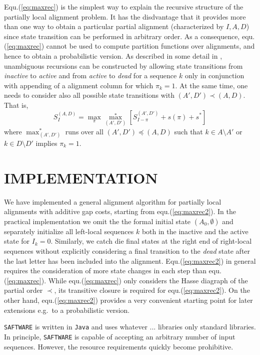 \documentclass[a4paper,10pt]{article}
\newcommand{\TODO}[1]{\begingroup\color{red}#1\endgroup}
\newcommand{\NR}[1]{\begingroup\color{orange}#1\endgroup}
\newcommand{\SAFTWARE}{\TODO{\texttt{SAFTWARE}}}
\begin{document}
Equ.(\ref{eq:maxrec}) is the simplest way to explain the recursive
structure of the partially local alignment problem. It has the disdvantage
that it provides more than one way to obtain a particular partial alignment
(characterized by $I,A,D$) since state transition can be performed in
arbitrary order. As a consequence, equ.(\ref{eq:maxrec}) cannot be used to
compute partition functions over alignments, and hence to obtain a
probabilistic version. As described in some detail in \citet{Retzlaff:18a},
unambiguous recursions can be constructed by allowing state transitions
from \textit{inactive} to \textit{active} and from \textit{active} to
\textit{dead} for a sequence $k$ only in conjunction with appending of a
alignment column for which $\pi_k=1$.  At the same time, one needs to
consider also all possible state transitions with $(A',D')\prec(A,D)$. That
is,
\begin{equation}
  S^{(A,D)}_I = 
  \displaystyle\max_{\pi} \displaystyle\max_{(A',D')}^*
  \left[ S^{(A',D')}_{I-\pi} + s(\pi) + s^* \right]
  \label{eq:maxrec2}
\end{equation}
where $\max_{(A',D')}^*$ runs over all $(A',D')\preceq(A,D)$ such that
$k\in A\setminus A'$ or $k\in D\setminus D'$ implies $\pi_k=1$.

\section{\uppercase{Implementation}}

We have implemented a general alignment algorithm for partially local
alignments with additive gap costs, starting from
equ.(\ref{eq:maxrec2}). In the practical implementation we omit the the
formal initial state $(A_0,\emptyset)$ and separately initialize all
left-local sequences $k$ both in the inactive and the active state for
$I_k=0$. Similarly, we catch die final states at the right end of
right-local sequences without explicitly considering a final transition to
the \textit{dead} state after the last letter has been included into the
alignment. Equ.(\ref{eq:maxrec2}) in general requires the consideration of
more state changes in each step than equ.(\ref{eq:maxrec}). While
equ.(\ref{eq:maxrec}) only considers the Hasse diagraph of the partial
order $\prec$, its transitive closure is required for
equ.(\ref{eq:maxrec2}). On the other hand, equ.(\ref{eq:maxrec2}) provides
a very convenient starting point for later extensions e.g.\ to a
probabilistic version. 

  
\SAFTWARE{} is written in \TODO{\texttt{Java} and uses whatever
  ... libraries} \NR{only standard libraries}.  In principle, \SAFTWARE{} is capable of accepting an
arbitrary number of input sequences. However, the resource requirements
quickly become prohibitive.
\end{document}
